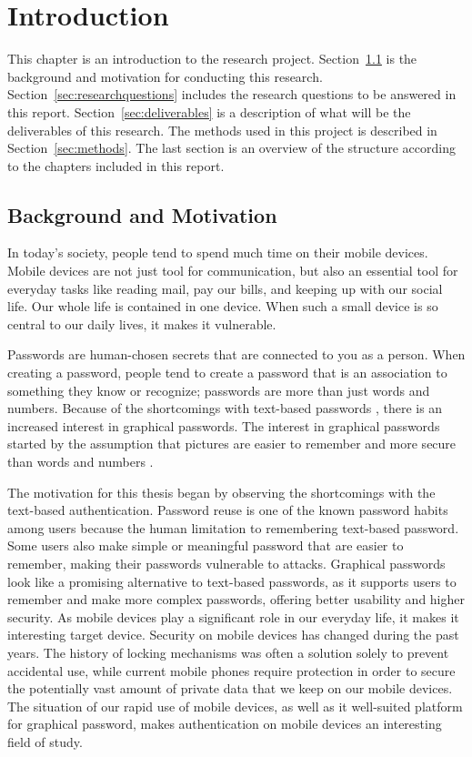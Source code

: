 \chapter{Introduction}

  This chapter is an introduction to the research project. Section~\ref{sec:background} is the background and motivation for conducting this research. Section~\ref{sec:researchquestions} includes the research questions to be answered in this report. Section~\ref{sec:deliverables} is a description of what will be the deliverables of this research.
  The methods used in this project is described in Section~\ref{sec:methods}. The last section is an overview of the structure according to the chapters included in this report. 

  \clearpage
  \section{Background and Motivation} \label{sec:background}
  In today's society, people tend to spend much time on their mobile devices. Mobile devices are not just tool for communication, but also an essential tool for everyday tasks like reading mail, pay our bills, and keeping up with our social life. Our whole life is contained in one device. When such a small device is so central to our daily lives, it makes it vulnerable.

  Passwords are human-chosen secrets that are connected to you as a person. When creating a password, people tend to create a password that is an association to something they know or recognize; passwords are more than just words and numbers. Because of the shortcomings with text-based passwords \cite{UnixPasswords}, there is an increased interest in graphical passwords. The interest in graphical passwords started by the assumption that pictures are easier to remember and more secure than words and numbers \cite{DeAngeli}.

  The motivation for this thesis began by observing the shortcomings with the text-based authentication. Password reuse is one of the known password habits among users because the human limitation to remembering text-based password. Some users also make simple or meaningful password that are easier to remember, making their passwords vulnerable to attacks. Graphical passwords look like a promising alternative to text-based passwords, as it supports users to remember and make more complex passwords, offering better usability and higher security. As mobile devices play a significant role in our everyday life, it makes it interesting target device. Security on mobile devices has changed during the past years. The history of locking mechanisms was often a solution solely to prevent accidental use, while current mobile phones require protection in order to secure the potentially vast amount of private data that we keep on our mobile devices. The situation of our rapid use of mobile devices, as well as it well-suited platform for graphical password, makes authentication on mobile devices an interesting field of study.

